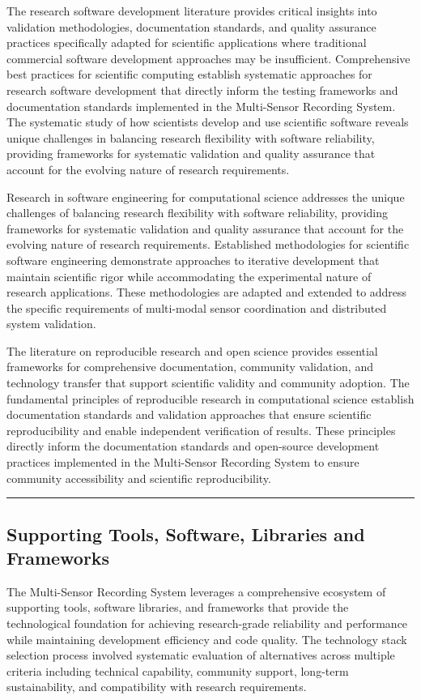 \documentclass[11pt,a4paper]{report}
\begin{document}
The research software development literature provides critical insights into validation methodologies, documentation
standards, and quality assurance practices specifically adapted for scientific applications where traditional commercial
software development approaches may be insufficient. Comprehensive best practices for scientific computing establish
systematic approaches for research software development that directly inform the testing frameworks and documentation
standards implemented in the Multi-Sensor Recording System. The systematic study of how scientists develop and use
scientific software reveals unique challenges in balancing research flexibility with software reliability, providing
frameworks for systematic validation and quality assurance that account for the evolving nature of research
requirements.

Research in software engineering for computational science addresses the unique challenges of balancing research
flexibility with software reliability, providing frameworks for systematic validation and quality assurance that account
for the evolving nature of research requirements. Established methodologies for scientific software engineering
demonstrate approaches to iterative development that maintain scientific rigor while accommodating the experimental
nature of research applications. These methodologies are adapted and extended to address the specific requirements of
multi-modal sensor coordination and distributed system validation.

The literature on reproducible research and open science provides essential frameworks for comprehensive documentation,
community validation, and technology transfer that support scientific validity and community adoption. The fundamental
principles of reproducible research in computational science establish documentation standards and validation approaches
that ensure scientific reproducibility and enable independent verification of results. These principles directly inform
the documentation standards and open-source development practices implemented in the Multi-Sensor Recording System to
ensure community accessibility and scientific reproducibility.

\hrule

\subsection{Supporting Tools, Software, Libraries and Frameworks}

The Multi-Sensor Recording System leverages a comprehensive ecosystem of supporting tools, software libraries, and
frameworks that provide the technological foundation for achieving research-grade reliability and performance while
maintaining development efficiency and code quality. The technology stack selection process involved systematic
evaluation of alternatives across multiple criteria including technical capability, community support, long-term
sustainability, and compatibility with research requirements.
\end{document}
